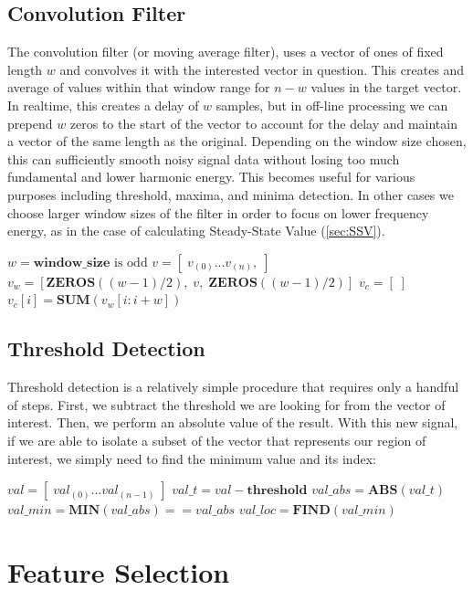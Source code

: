 \documentclass[conference]{IEEEtran}
\begin{document}
\subsection{Convolution Filter}
The convolution filter (or moving average filter), uses a vector of ones of fixed length $w$ and convolves it with the interested vector in question. This creates and average of values within that window range for $n-w$ values in the target vector. In realtime, this creates a delay of $w$ samples, but in off-line processing we can prepend $w$ zeros to the start of the vector to account for the delay and maintain a vector of the same length as the original.
Depending on the window size chosen, this can sufficiently smooth noisy signal data without losing too much fundamental and lower harmonic energy. This becomes useful for various purposes including threshold, maxima, and minima detection. In other cases we choose larger window sizes of the filter in order to focus on lower frequency energy, as in the case of calculating Steady-State Value (\ref{sec:SSV}).
\medbreak
\begin{algorithmic}
\STATE $w = \textbf{window\_size} \text{ is odd}$
\STATE $v = [\;v_{(0)} ... v_{(n)},\;]$
\STATE $v_w = [ \textbf{ZEROS}((w-1)/2), \;v,\; \textbf{ZEROS}((w-1)/2)]$
\STATE $v_c = [\;]$
    \STATE $v_c[i] = \textbf{SUM}(v_w[i:i+w])$
\ENDFOR
\end{algorithmic}

\subsection{Threshold Detection} \label{sec:Threshold}
Threshold detection is a relatively simple procedure that requires only a handful of steps. First, we subtract the threshold we are looking for from the vector of interest. Then, we perform an absolute value of the result. With this new signal, if we are able to isolate a subset of the vector that represents our region of  interest, we simply need to find the minimum value and its index:
\medbreak
\begin{algorithmic}
\STATE $val = [\;val_{(0)} ... val_{(n-1)}\;]$
\STATE $val\_t = val - \textbf{threshold}$
\STATE $val\_abs = \textbf{ABS}(val\_t)$
\STATE $val\_min = \textbf{MIN}(val\_abs) == val\_abs$
\STATE $val\_loc = \textbf{FIND}( val\_min ) $
\end{algorithmic}



\section{Feature Selection}
\end{document}
